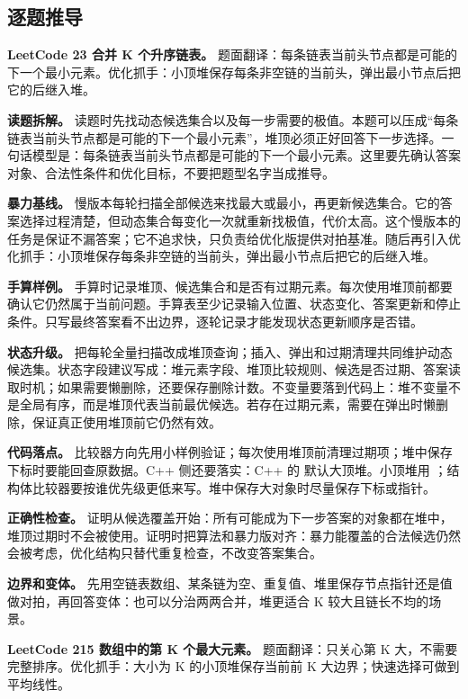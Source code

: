 \subsection{逐题推导}

\noindent\textbf{LeetCode 23 合并 K 个升序链表。} 题面翻译：每条链表当前头节点都是可能的下一个最小元素。优化抓手：小顶堆保存每条非空链的当前头，弹出最小节点后把它的后继入堆。

\textbf{读题拆解。} 读题时先找动态候选集合以及每一步需要的极值。本题可以压成“每条链表当前头节点都是可能的下一个最小元素”，堆顶必须正好回答下一步选择。一句话模型是：每条链表当前头节点都是可能的下一个最小元素。这里要先确认答案对象、合法性条件和优化目标，不要把题型名字当成推导。

\textbf{暴力基线。} 慢版本每轮扫描全部候选来找最大或最小，再更新候选集合。它的答案选择过程清楚，但动态集合每变化一次就重新找极值，代价太高。这个慢版本的任务是保证不漏答案；它不追求快，只负责给优化版提供对拍基准。随后再引入优化抓手：小顶堆保存每条非空链的当前头，弹出最小节点后把它的后继入堆。

\textbf{手算样例。} 手算时记录堆顶、候选集合和是否有过期元素。每次使用堆顶前都要确认它仍然属于当前问题。手算表至少记录输入位置、状态变化、答案更新和停止条件。只写最终答案看不出边界，逐轮记录才能发现状态更新顺序是否错。

\textbf{状态升级。} 把每轮全量扫描改成堆顶查询；插入、弹出和过期清理共同维护动态候选集。状态字段建议写成：堆元素字段、堆顶比较规则、候选是否过期、答案读取时机；如果需要懒删除，还要保存删除计数。不变量要落到代码上：堆不变量不是全局有序，而是堆顶代表当前最优候选。若存在过期元素，需要在弹出时懒删除，保证真正使用堆顶前它仍然有效。

\textbf{代码落点。} 比较器方向先用小样例验证；每次使用堆顶前清理过期项；堆中保存下标时要能回查原数据。C++ 侧还要落实：C++ 的  默认大顶堆。小顶堆用 ；结构体比较器要按谁优先级更低来写。堆中保存大对象时尽量保存下标或指针。

\textbf{正确性检查。} 证明从候选覆盖开始：所有可能成为下一步答案的对象都在堆中，堆顶过期时不会被使用。证明时把算法和暴力版对齐：暴力能覆盖的合法候选仍然会被考虑，优化结构只替代重复检查，不改变答案集合。

\textbf{边界和变体。} 先用空链表数组、某条链为空、重复值、堆里保存节点指针还是值做对拍，再回答变体：也可以分治两两合并，堆更适合 K 较大且链长不均的场景。

\noindent\textbf{LeetCode 215 数组中的第 K 个最大元素。} 题面翻译：只关心第 K 大，不需要完整排序。优化抓手：大小为 K 的小顶堆保存当前前 K 大边界；快速选择可做到平均线性。

